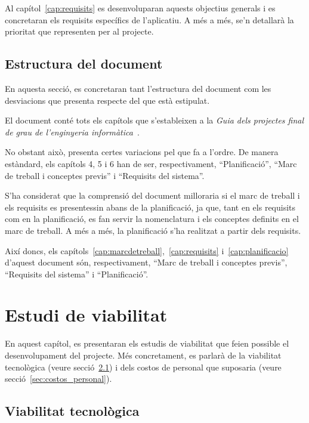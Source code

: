 \documentclass[a4paper,12pt]{ThesisStyle}
\begin{document}
Al capítol~\ref{cap:requisits} es desenvoluparan aquests objectius generals i es concretaran els requisits específics de l'aplicatiu. A més a més, se'n detallarà la prioritat que representen per al projecte.

\section{Estructura del document}
\label{sec:estructura_document}

En aquesta secció, es concretaran tant l'estructura del document com les desviacions que presenta respecte del que està estipulat.

El document conté tots els capítols que s'estableixen a la \textit{Guia dels projectes final de grau de l'enginyeria informàtica}~\cite{GuiaPFG}.

No obstant això, presenta certes variacions pel que fa a l'ordre. De manera estàndard, els capítols 4, 5 i 6 han de ser, respectivament, ``Planificació'', ``Marc de treball i conceptes previs'' i ``Requisits del sistema''.

S'ha considerat que la comprensió del document milloraria si el marc de treball i els requisits es presentessin abans de la planificació, ja que, tant en els requisits com en la planificació, es fan servir la nomenclatura i els conceptes definits en el marc de treball. A més a més, la planificació s'ha realitzat a partir dels requisits.

Així doncs, els capítols~\ref{cap:marcdetreball},~\ref{cap:requisits} i~\ref{cap:planificacio} d'aquest document són, respectivament, ``Marc de treball i conceptes previs'', ``Requisits del sistema'' i ``Planificació''.


\chapter{Estudi de viabilitat}
\label{cap:viabilitat}

En aquest capítol, es presentaran els estudis de viabilitat que feien possible el desenvolupament del projecte. Més concretament, es parlarà de la viabilitat tecnològica (veure secció~\ref{sec:viabilitat_tecnologica}) i dels costos de personal que suposaria (veure secció~\ref{sec:costos_personal}).

\section{Viabilitat tecnològica}
\label{sec:viabilitat_tecnologica}
\end{document}
